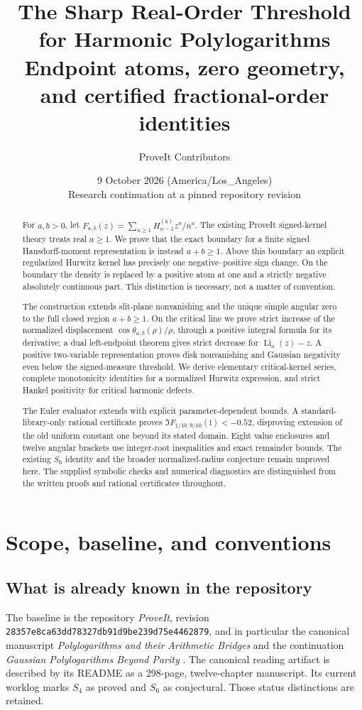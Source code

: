 \documentclass[11pt]{article}
\title{\textbf{The Sharp Real-Order Threshold\\for Harmonic Polylogarithms}\\[7pt]
\large Endpoint atoms, zero geometry, and certified fractional-order identities}
\author{ProveIt Contributors}
\date{9 October 2026 (America/Los\_Angeles)\\[3pt]
\small Research continuation at a pinned repository revision}
\numberwithin{equation}{section}
\theoremstyle{definition}\newtheorem{definition}[theorem]{Definition}
\theoremstyle{remark}\newtheorem{remark}[theorem]{Remark}
\newcommand{\ii}{\mathrm i}
\DeclareMathOperator{\Li}{Li}
\newcommand{\basecommit}{\nolinkurl{28357e8ca63dd78327db91d9be239d75e4462879}}
\begin{document}
\maketitle\thispagestyle{empty}
\begin{abstract}
For $a,b>0$, let $F_{a,b}(z)=\sum_{n\ge1}H_{n-1}^{(b)}z^n/n^a$.
The existing ProveIt signed-kernel theory treats real $a\ge1$.
We prove that the exact boundary for a finite signed Hausdorff-moment
representation is instead $a+b\ge1$. Above this boundary an explicit
regularized Hurwitz kernel has precisely one negative--positive sign
change. On the boundary the density is replaced by a positive atom at
one and a strictly negative absolutely continuous part. This distinction
is necessary, not a matter of convention.

The construction extends slit-plane nonvanishing and the unique simple
angular zero to the full closed region $a+b\ge1$. On the critical line
we prove strict increase of the normalized displacement
$\cos\theta_{a,b}(\rho)/\rho$, through a positive integral formula for its
derivative; a dual left-endpoint theorem gives strict decrease for
$\Li_a(z)-z$. A positive two-variable representation proves disk
nonvanishing and Gaussian negativity even below the signed-measure
threshold. We derive elementary critical-kernel series, complete
monotonicity identities for a normalized Hurwitz expression, and strict
Hankel positivity for critical harmonic defects.

The Euler evaluator extends with explicit parameter-dependent bounds.
A standard-library-only rational certificate proves
$\Im F_{1/10,9/10}(\ii)<-0.52$, disproving extension of the old uniform
constant one beyond its stated domain. Eight value enclosures and twelve
angular brackets use integer-root inequalities and exact remainder
bounds. The existing $S_6$ identity and the broader normalized-radius
conjecture remain unproved here. The supplied symbolic checks and
numerical diagnostics are distinguished from the written proofs and
rational certificates throughout.
\end{abstract}
\clearpage
\begingroup\small
\tableofcontents
\endgroup
\clearpage

\section{Scope, baseline, and conventions}
\label{sec:scope}

\subsection{What is already known in the repository}
The baseline is the repository \emph{ProveIt}, revision \basecommit,
and in particular the canonical manuscript
\emph{Polylogarithms and their Arithmetic Bridges} and the continuation
\emph{Gaussian Polylogarithms Beyond Parity} \cite{repo,angular}.
The canonical reading artifact is described by its README as a 298-page,
twelve-chapter manuscript. Its current worklog marks $S_4$ as proved and
$S_6$ as conjectural. Those status distinctions are retained.
\end{document}
